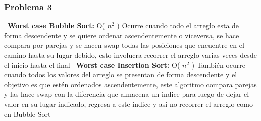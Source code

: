 \documentclass{beamer}
\begin{document}
\begin{frame}
\frametitle{Problema 3}
\ \textbf{Worst case Bubble Sort:} O( $n^2$ ) 
\newline Ocurre cuando todo el arreglo esta de forma descendente y se quiere ordenar ascendentemente o viceversa, se hace compara por parejas y se hacen swap todas las posiciones que encuentre en el camino hasta su lugar debido, esto involucra recorrer el arreglo varias veces desde el inicio hasta el final
\newline 
\newline
\ \textbf{Worst case Insertion Sort:} O( $n^2$ ) 
\newline También ocurre cuando todos los valores del arreglo se presentan de forma descendente y el objetivo es que estén ordenados ascendentemente, este algoritmo compara parejas y las hace swap  con la diferencia que almacena un indice para luego de dejar el valor en su lugar indicado, regresa a este indice y así no recorrer el arreglo como en Bubble Sort
\end{frame}
\end{document}
